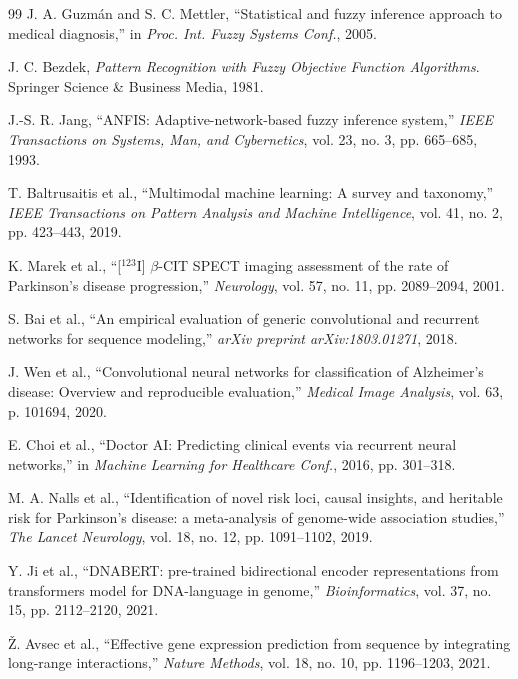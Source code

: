 \documentclass[pdflatex,sn-mathphys-num]{sn-jnl}
\begin{document}
\begin{thebibliography}{99}
J. A. Guzmán and S. C. Mettler, ``Statistical and fuzzy inference approach to medical diagnosis,'' in \textit{Proc. Int. Fuzzy Systems Conf.}, 2005.

J. C. Bezdek, \textit{Pattern Recognition with Fuzzy Objective Function Algorithms}. Springer Science \& Business Media, 1981.

J.-S. R. Jang, ``ANFIS: Adaptive-network-based fuzzy inference system,'' \textit{IEEE Transactions on Systems, Man, and Cybernetics}, vol. 23, no. 3, pp. 665--685, 1993.

T. Baltrusaitis et al., ``Multimodal machine learning: A survey and taxonomy,'' \textit{IEEE Transactions on Pattern Analysis and Machine Intelligence}, vol. 41, no. 2, pp. 423--443, 2019.

K. Marek et al., ``[$^{123}$I] $\beta$-CIT SPECT imaging assessment of the rate of Parkinson's disease progression,'' \textit{Neurology}, vol. 57, no. 11, pp. 2089--2094, 2001.

S. Bai et al., ``An empirical evaluation of generic convolutional and recurrent networks for sequence modeling,'' \textit{arXiv preprint arXiv:1803.01271}, 2018.

J. Wen et al., ``Convolutional neural networks for classification of Alzheimer's disease: Overview and reproducible evaluation,'' \textit{Medical Image Analysis}, vol. 63, p. 101694, 2020.

E. Choi et al., ``Doctor AI: Predicting clinical events via recurrent neural networks,'' in \textit{Machine Learning for Healthcare Conf.}, 2016, pp. 301--318.

M. A. Nalls et al., ``Identification of novel risk loci, causal insights, and heritable risk for Parkinson's disease: a meta-analysis of genome-wide association studies,'' \textit{The Lancet Neurology}, vol. 18, no. 12, pp. 1091--1102, 2019.

Y. Ji et al., ``DNABERT: pre-trained bidirectional encoder representations from transformers model for DNA-language in genome,'' \textit{Bioinformatics}, vol. 37, no. 15, pp. 2112--2120, 2021.

Ž. Avsec et al., ``Effective gene expression prediction from sequence by integrating long-range interactions,'' \textit{Nature Methods}, vol. 18, no. 10, pp. 1196--1203, 2021.


\end{thebibliography}
\end{document}
